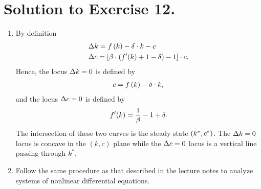 \documentclass[letterpaper,12pt,leqno]{article}
\begin{document}
\section*{Solution to Exercise 12.}

\begin{enumerate}
\item By definition
\begin{align*}
\Delta &k=f\left( k \right) -\delta\cdot  k-c \\
\Delta &c=\left[ \beta \cdot \left( f'(k) +1-\delta \right) -1 \right]\cdot  c.
\end{align*}
Hence, the locus $\Delta k=0$ is defined by
\begin{align*}
c=f\left( k \right) -\delta\cdot  k,
\end{align*}
and the locus $\Delta c=0$ is defined by
\begin{align*}
f'(k) =\frac{1}{\beta}-1+\delta.
\end{align*}
The intersection of these two curves is the steady state $\left( k^*,c^* \right) $. The $\Delta k=0$ locus is concave in the $(k,c)$ plane while the $\Delta c=0$ locus is a vertical line passing through $k^*$.

\item Follow the same procedure as that described in the lecture notes to analyze systems of nonlinear differential equations.
\end{enumerate}
\end{document}
